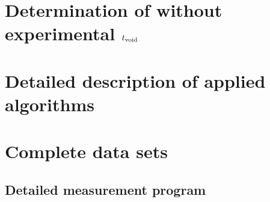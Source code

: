 \section*{Determination of without experimental $t_\text{void}$}


\clearpage
\section*{Detailed description of applied algorithms}

%
%    
\section*{Complete data sets}

\subsection*{Detailed measurement program}

\begin{comment}
VC 1\\
VC 3\\
VC 2\\
VC 1\\
Thyro\\
VC 1\\
VC 0.75\\
VC 0.5\\
VC 1\\
VC 0.75\\
VC 0.5\\
VC 1\\
VC 0.75\\
VC 0.5\\
\end{comment}

\printbibliography



